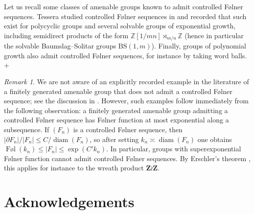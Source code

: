 \documentclass[a4paper,11pt]{amsproc}
\theoremstyle{remark}
\newtheorem{remark}[theorem]{Remark}
\begin{document}
Let us recall some classes of amenable groups known to admit controlled Følner sequences. Tessera studied controlled Følner sequences in \cite{Tess09} and recorded that such exist for polycyclic groups and several solvable groups of exponential growth, including semidirect products of the form $\mathbb Z[1/mn]\rtimes_{m/n}\mathbb Z$ (hence in particular the solvable Baumslag--Solitar groups $\mathrm{BS}(1,m)$). Finally, groups of polynomial growth also admit controlled Følner sequences, for instance by taking word balls. 
+
\begin{remark}
We are not aware of an explicitly recorded example in the literature of a finitely generated amenable group that does not admit a controlled Følner sequence; see the discussion in \cite{CS15}. However, such examples follow immediately from the following observation: a finitely generated amenable group admitting a controlled Følner sequence has Følner function at most exponential along a subsequence. If $(F_n)$ is a controlled Følner sequence, then $|\partial F_n|/|F_n| \leq C/\operatorname{diam}(F_n)$, so after setting $k_n \asymp \operatorname{diam}(F_n)$ one obtains $\operatorname{Føl}(k_n)\leq |F_n| \leq \exp(C'k_n)$. In particular, groups with superexponential Følner function cannot admit controlled Følner sequences. By Erschler's theorem \cite[Theorem~1]{Erschler03}, this applies for instance to the wreath product $\mathbf Z \wr \mathbf Z$.
\end{remark}

\section*{Acknowledgements}
\end{document}
